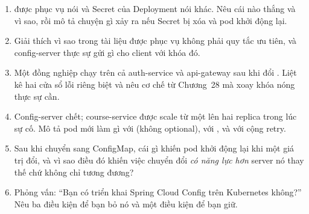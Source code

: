 \begin{quiz}
\begin{enumerate}
  \item {} được phục vụ nói 
  và Secret của Deployment nói khác. Nêu cái nào thắng và vì sao, rồi mô
  tả chuyện gì xảy ra nếu Secret bị xóa và pod khởi động lại.
  \item Giải thích vì sao 
  trong tài liệu được phục vụ không phải quy tắc ưu tiên, và
  config-server thực sự gửi gì cho client với khóa đó.
  \item Một đồng nghiệp chạy  trên cả
  auth-service và api-gateway sau khi đổi . Liệt kê
  hai cửa sổ lỗi riêng biệt và nêu cơ chế từ Chương~28 mà xoay khóa
  nóng thực sự cần.
  \item Config-server chết; course-service được scale từ một lên hai
  replica trong lúc sự cố. Mô tả pod mới làm gì với 
  (không optional), với , và với
   cộng retry.
  \item Sau khi chuyển sang ConfigMap, cái gì khiến pod khởi động lại
  khi một giá trị đổi, và vì sao điều đó khiến việc chuyển đổi \emph{có
  năng lực hơn} server nó thay thế chứ không chỉ tương đương?
  \item Phỏng vấn: ``Bạn có triển khai Spring Cloud Config trên
  Kubernetes không?'' Nêu ba điều kiện để bạn bỏ nó và một điều kiện để
  bạn giữ.
\end{enumerate}
\end{quiz}
